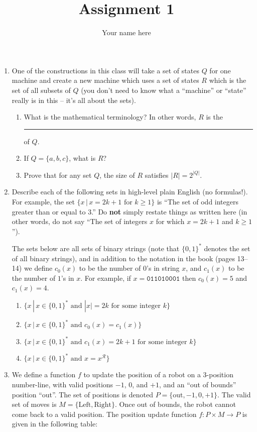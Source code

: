 \documentclass[11pt]{article}
\title{Assignment 1}
\author{Your name here}
\begin{document}
\maketitle

\begin{enumerate}
\item
  One of the constructions in this class will take a set of states $Q$
  for one machine and create a new machine which uses a set of states
  $R$ which is the set of all subsets of $Q$ (you don't need to know
  what a ``machine'' or ``state'' really is in this -- it's all about
  the sets).

  \begin{enumerate}
  \item
    What is the mathematical terminology? In other words, $R$ is the
    \rule{1in}{0.4pt} of $Q$.
  \item
    If $Q=\{a,b,c\}$, what is $R$?
  \item
    Prove that for any set $Q$, the size of $R$ satisfies
    $|R|=2^{|Q|}$.
  \end{enumerate}
\item
  Describe each of the following sets in high-level plain English (no
  formulas!). For example, the set $\{x\,|\,x=2k+1 \text{ for } k\geq 1\}$
  is ``The set of odd integers greater than or equal to 3.'' Do
  \textbf{not} simply restate things as written here (in other words, do
  not say ``The set of integers $x$ for which $x=2k+1$ and
  $k\geq 1$'').

  The sets below are all sets of binary strings (note that $\{0,1\}^*$
  denotes the set of all binary strings), and in addition to the
  notation in the book (pages 13--14) we define $c_0(x)$ to be the
  number of $0$'s in string $x$, and $c_1(x)$ to be the number of
  $1$'s in $x$. For example, if $x=\texttt{011010001}$ then
  $c_0(x)=5$ and $c_1(x)=4$.

  \begin{enumerate}
  \item
    $\{x\,|\,x\in\{0,1\}^* \text{ and } |x|=2k \text{ for some integer } k\}$
  \item
    $\{x\,|\,x\in\{0,1\}^* \text{ and } c_0(x)=c_1(x)\}$
  \item
    $\{x\,|\,x\in\{0,1\}^* \text{ and } c_1(x)=2k+1 \text{ for some
      integer } k\}$
  \item
    $\{x\,|\,x\in\{0,1\}^* \text{ and } x=x^{\mathcal{R}}\}$
  \end{enumerate}
\item
  We define a function $f$ to update the position of a robot on a
  3-position number-line, with valid positions $-1$, $0$, and
  $+1$, and an ``out of bounds'' position ``out''. The set of
  positions is denoted $P=\{\text{out}, -1, 0, +1\}$. The valid set of
  moves is $M=\{\text{Left}, \text{Right}\}$. Once out of bounds, the
  robot cannot come back to a valid position. The position update
  function $f: P\times M\rightarrow P$ is given in the following
  table:


\end{enumerate}
\end{document}
